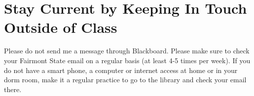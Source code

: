 \section{Stay Current by Keeping In Touch Outside of Class}

 Please do not send me a message through Blackboard. Please make sure to check your Fairmont State email on a regular basis (at least 4-5 times per week). If you do not have a smart phone, a computer or internet access at home or in your dorm room, make it a regular practice to go to the library and check your email there.
